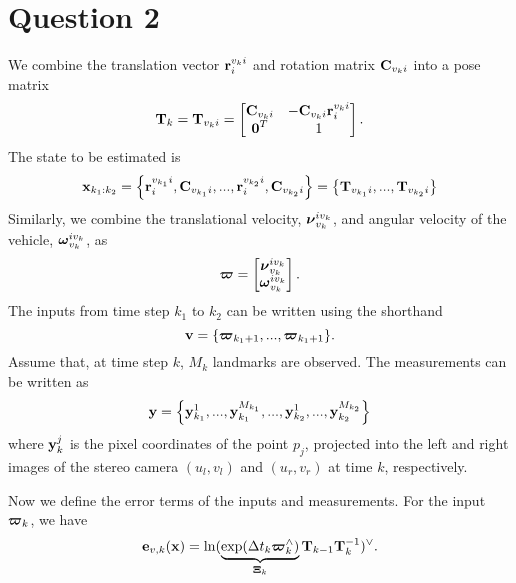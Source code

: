\documentclass[a4paper]{article}
\begin{document}
\section*{Question 2}

We combine the translation vector $\bm{\mathbf{r}}_i^{v_k i}$ and rotation matrix $\bm{\mathbf{C}}_{v_k i}$ into a pose matrix
\begin{equation}
\bm{\mathbf{T}}_k = \bm{\mathbf{T}}_{v_k i} = \begin{bmatrix}
  \bm{\mathbf{C}}_{v_k i} & -\bm{\mathbf{C}}_{v_k i} \bm{\mathbf{r}}_i^{v_k i} \\ \bm{\mathbf{0}}^T & 1
\end{bmatrix}.
\end{equation}
The state to be estimated is
\begin{equation}
    \bm{\mathbf{x}}_{k_1: k_2} = \left\{ \bm{\mathbf{r}}_i^{v_{k_1} i}, \bm{\mathbf{C}}_{v_{k_1} i}, ..., \bm{\mathbf{r}}_i^{v_{k_2} i}, \bm{\mathbf{C}}_{v_{k_2} i} \right\} = \left\{ \bm{\mathbf{T}}_{v_{k_1} i}, ..., \bm{\mathbf{T}}_{v_{k_2} i} \right\}
\end{equation}
Similarly, we combine the translational velocity, $\bm{\mathbf{\nu}}_{v_k}^{i v_k}$, and angular velocity of the vehicle, $\bm{\mathbf{\omega}}_{v_k}^{i v_k}$, as 
\begin{equation}
    \bm{\mathbf{\varpi}} = \begin{bmatrix}
      \bm{\mathbf{\nu}}_{v_k}^{i v_k} \\ \bm{\mathbf{\omega}}_{v_k}^{i v_k}
    \end{bmatrix}.
\end{equation}
The inputs from time step $k_1$ to $k_2$ can be written using the shorthand
\begin{equation}
    \bm{\mathbf{v}} = \{ \bm{\mathbf{\varpi}}_{k_1+1}, ..., \bm{\mathbf{\varpi}}_{k_1+1} \}.
\end{equation}
Assume that, at time step $k$, $M_k$ landmarks are observed. The measurements can be written as
\begin{equation}
    \bm{\mathbf{y}} = \left\{ \bm{\mathbf{y}}^{1}_{k_1}, ..., \bm{\mathbf{y}}^{M_{k_1}}_{k_1}, ..., \bm{\mathbf{y}}^{1}_{k_2}, ..., \bm{\mathbf{y}}^{M_{k_2}}_{k_2} \right\} 
\end{equation}
where $\bm{\mathbf{y}}_k^j$ is the pixel coordinates of the point $p_j$, projected into the left and right images of the stereo camera $(u_l, v_l)$ and $(u_r, v_r)$ at time $k$, respectively.

Now we define the error terms of the inputs and measurements. For the input $\bm{\mathbf{\varpi}}_k$, we have 
\begin{equation}
    \bm{\mathbf{e}}_{v, k}(\bm{\mathbf{x}}) = \ln (\underbrace{\exp(\Delta t_k \bm{\mathbf{\varpi}}_k^\wedge)}_{\bm{\mathbf{\Xi}}_k} \bm{\mathbf{T}}_{k-1} \bm{\mathbf{T}}_k^{-1})^\vee.
\end{equation}
\end{document}
